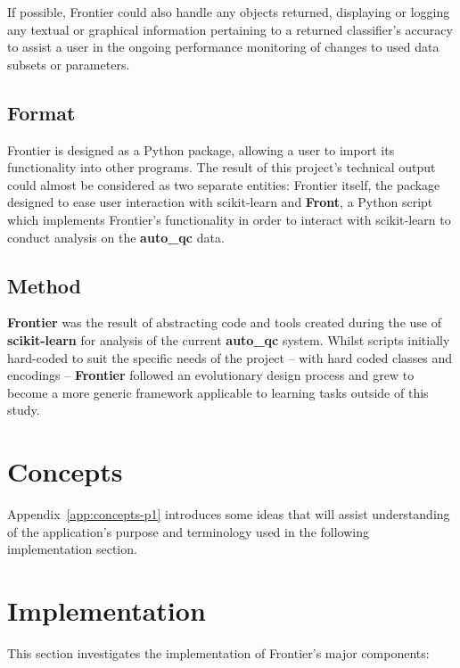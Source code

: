 If possible, Frontier could also handle any objects returned, displaying or
logging any textual or graphical information pertaining to a returned
classifier's accuracy to assist a user in the ongoing performance monitoring of
changes to used data subsets or parameters.


\subsection{Format}

Frontier is designed as a Python package, allowing a user to import its
functionality into other programs. The result of this project's technical
output could almost be considered as two separate entities: Frontier itself, the
package designed to ease user interaction with scikit-learn and \textbf{Front},
a Python script which implements Frontier's functionality in order to interact
with scikit-learn to conduct analysis on the \textbf{auto\_qc} data.


\subsection{Method}
\label{sec:frontier-method}

\textbf{Frontier} was the result of abstracting code and tools created during
the use of \textbf{scikit-learn} for analysis of the current \textbf{auto\_qc}
system. Whilst scripts initially hard-coded to suit the specific needs of the
project -- with hard coded classes and encodings -- \textbf{Frontier} followed
an evolutionary design process and grew to become a more generic framework
applicable to learning tasks outside of this study.


\section{Concepts}

Appendix~\ref{app:concepts-p1} introduces some ideas that will assist
understanding of the application's purpose and terminology used in the following
implementation section.

\pagebreak
\section{Implementation}

This section investigates the implementation of Frontier's major components:

